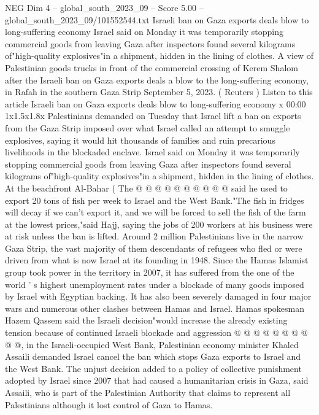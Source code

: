 \begin{textsample}{NEG Dim 4 – global\_south\_2023\_09 – Score 5.00 – global\_south\_2023\_09/101552544.txt}  \label{ex:f4_neg_029}
Israeli ban on Gaza exports deals blow to long-suffering economy Israel said on Monday it was temporarily stopping commercial goods from leaving Gaza after inspectors found several kilograms of"high-quality explosives"in a shipment, hidden in the lining of clothes.
A view of Palestinian goods trucks in front of the commercial crossing of Kerem Shalom after the Israeli ban on Gaza exports deals a blow to the long-suffering economy, in Rafah in the southern Gaza Strip September 5, 2023. ( Reuters ) Listen to this article Israeli ban on Gaza exports deals blow to long-suffering economy x 00:00 1x1.5x1.8x Palestinians demanded on Tuesday that Israel lift a ban on exports from the Gaza Strip imposed over what Israel called an attempt to smuggle explosives, saying it would hit thousands of families and ruin precarious livelihoods in the blockaded enclave.
Israel said on Monday it was temporarily stopping commercial goods from leaving Gaza after inspectors found several kilograms of"high-quality explosives"in a shipment, hidden in the lining of clothes.
At the beachfront Al-Bahar ( The @ @ @ @ @ @ @ @ @ @ said he used to export 20 tons of fish per week to Israel and the West Bank."The fish in fridges will decay if we can't export it, and we will be forced to sell the fish of the farm at the lowest prices,"said Hajj, saying the jobs of 200 workers at his business were at risk unless the ban is lifted.
Around 2 million Palestinians live in the narrow Gaza Strip, the vast majority of them descendants of refugees who fled or were driven from what is now Israel at its founding in 1948.
Since the Hamas Islamist group took power in the territory in 2007, it has suffered from the one of the world ' s highest unemployment rates under a blockade of many goods imposed by Israel with Egyptian backing.
It has also been severely damaged in four major wars and numerous other clashes between Hamas and Israel.
Hamas spokesman Hazem Qassem said the Israeli decision"would increase the already existing tension because of continued Israeli blockade and aggression @ @ @ @ @ @ @ @ @ @, in the Israeli-occupied West Bank, Palestinian economy minister Khaled Assaili demanded Israel cancel the ban which stops Gaza exports to Israel and the West Bank.
The unjust decision added to a policy of collective punishment adopted by Israel since 2007 that had caused a humanitarian crisis in Gaza, said Assaili, who is part of the Palestinian Authority that claims to represent all Palestinians although it lost control of Gaza to Hamas.

\end{textsample}
